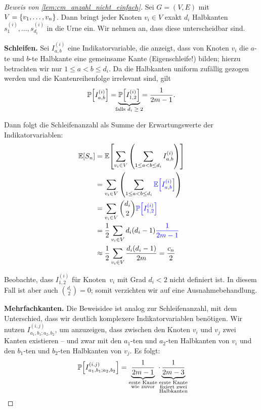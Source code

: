 \begin{proof}[Beweis von \cref{lem:cm_anzahl_nicht_einfach}]
    Sei $G= (V,E)$ mit $V = \left\{v_1, \ldots, v_n\right\}$.
    Dann bringt jeder Knoten $v_i \in V$ exakt $d_i$ Halbkanten $s_{1}^{(i)}, \ldots, s_{d_i}^{(i)}$ in die Urne ein.
    Wir nehmen an, dass diese unterscheidbar sind.

    \textbf{Schleifen. }
    Sei $I_{a,b}^{(i)}$ eine Indikatorvariable, die anzeigt, dass von Knoten $v_i$ die $a$-te und $b$-te Halbkante eine gemeinsame Kante (Eigenschleife!) bilden;
    hierzu betrachten wir nur $1\le a < b \le d_i$.
    Da die Halbkanten uniform zufällig gezogen werden und die Kantenreihenfolge irrelevant sind, gilt
    \begin{equation}
        \prob{I_{a,b}^{(i)}} = \underbrace{\prob{I_{1,2}^{(i)}}}_{\mathclap{\text{falls $d_i \ge 2$}}} = \frac{1}{2m - 1}.
    \end{equation}

    \noindent
    Dann folgt die Schleifenanzahl als Summe der Erwartungswerte der Indikatorvariablen:
    \begin{align}
        \mathbb{E}\!\left[S_n\right] & = \mathbb{E}\!\left[\sum_{v_i \in V} \left( \sum_{1 \le a < b \le d_i} I_{a,b}^{(i)} \right)\right]                    \\
                   & = \sum_{v_i \in V}  \left( \sum_{1 \le a < b \le d_i} \textcolor{blue}{\mathbb{E}\!\left[I_{a,b}^{(i)}\right]} \right) \\
                   & = \sum_{v_i \in V} \binom{d_i}{2} \textcolor{blue}{\mathbb{P}\!\left[I_{1,2}^{(i)}\right]}                             \\
                   & = \frac 1 2 \sum_{v_i \in V} d_i (d_i - 1) \textcolor{blue}{\frac{1}{2m - 1}}                        \\
                   & \approx \frac 1 2 \sum_{v_i \in V} \frac{d_i (d_i - 1)}{2 m} = \frac{c_n}{2}
    \end{align}

    Beobachte, dass $I_{1,2}^{(i)}$ für Knoten~$v_i$ mit Grad $d_i <2$ nicht definiert ist.
    In diesem Fall ist aber auch $\binom{d_i}{2} = 0$; somit verzichten wir auf eine Ausnahmebehandlung.

    \textbf{Mehrfachkanten.}
    Die Beweisidee ist analog zur Schleifenanzahl, mit dem Unterschied, dass wir deutlich komplexere Indikatorvariablen benötigen.
    Wir nutzen $I^{(i,j)}_{a_1,b_1;a_2,b_2}$, um anzuzeigen, dass zwischen den Knoten $v_i$ und $v_j$ zwei Kanten existieren -- und zwar mit den $a_1$-ten und $a_2$-ten Halbkanten von $v_i$ und den $b_1$-ten und $b_2$-ten Halbkanten von $v_j$.
    Es folgt:
    \begin{equation}
        \prob{I^{(i,j)}_{a_1,b_1;a_2,b_2}} = \underbrace{\frac{1}{2m - 1}}_{\substack{\text{erste Kante} \\ \text{wie zuvor}}} \cdot \underbrace{\frac{1}{2m - 3}}_{\mathclap{\substack{\text{erste Kante} \\ \text{fixiert zwei} \\ \text{Halbkanten}}}}
    \end{equation}


\end{proof}
